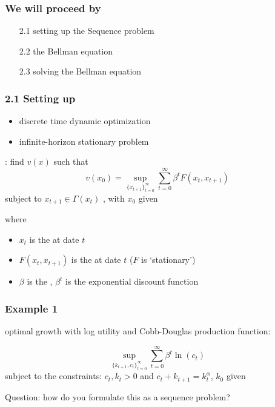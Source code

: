 \documentclass[compress,aspectratio=169]{beamer}
\begin{document}
\begin{frame}
\frametitle{We will proceed by}
\vspace{2 mm}
\begin{itemize}
\item[2.1] setting up the Sequence problem
\vspace{2 mm}
\item[2.2] the Bellman equation
\vspace{2 mm}
\item[2.3] solving the Bellman equation
\end{itemize}
\end{frame}

\begin{frame}
\frametitle{2.1 Setting up}
\begin{itemize}
\item discrete time dynamic optimization
\item infinite-horizon stationary problem 
\end{itemize}
\vspace{2 mm}

{\textbf{\color{red!50!blue}{the sequence problem}}}: find $v(x)$ such that
\begin{displaymath}
v(x_0)=\sup_{\{x_{t+1}\}_{t=0}^{\infty}}\sum_{t=0}^{\infty}\beta^t F(x_t,x_{t+1})
\end{displaymath}
subject to $x_{t+1}\in \Gamma (x_t)$ {}, with $x_0$ given \\
\vspace{2 mm}

where
\begin{itemize}
\item $x_t$ is the {\color{red!30!blue}{state vector}} at date $t$
\item $F(x_t,x_{t+1})$ is the {\color{red!70!white}{flow payoff}} at date $t$ ($F$ is `stationary')
\item $\beta$ is the {\color{green!70!blue}{exponential discount factor}}, $\beta^t$ is the exponential discount function
\end{itemize}
\end{frame}

\begin{frame}
\frametitle{Example 1}
optimal growth with log utility and Cobb-Douglas production function:

\begin{displaymath}
\sup_{\{k_{t+1},c_{t}\}_{t=0}^{\infty}}\sum_{t=0}^{\infty}\beta^t \ln(c_t)
\end{displaymath}
subject to the constraints: $c_t,k_t>0$ and $c_t+k_{t+1}=k_t^\alpha$, $k_0$ given

\vspace{2 mm}
Question: how do you formulate this as a sequence problem? \\
{\footnotesize{\color{gray}{[Hint: eliminate redundant variables, and introduce the constraint function $\Gamma$]}}}

\vspace{30 mm}
\end{frame}
\end{document}
